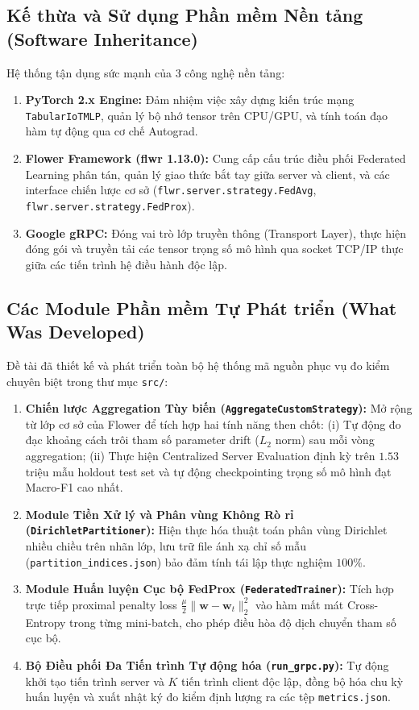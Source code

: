 \subsection{Kế thừa và Sử dụng Phần mềm Nền tảng (Software Inheritance)}
Hệ thống tận dụng sức mạnh của 3 công nghệ nền tảng:
\begin{enumerate}
    \item \textbf{PyTorch 2.x Engine:} Đảm nhiệm việc xây dựng kiến trúc mạng \texttt{TabularIoTMLP}, quản lý bộ nhớ tensor trên CPU/GPU, và tính toán đạo hàm tự động qua cơ chế Autograd.
    \item \textbf{Flower Framework (flwr 1.13.0):} Cung cấp cấu trúc điều phối Federated Learning phân tán, quản lý giao thức bắt tay giữa server và client, và các interface chiến lược cơ sở (\texttt{flwr.server.strategy.FedAvg}, \texttt{flwr.server.strategy.FedProx}).
    \item \textbf{Google gRPC:} Đóng vai trò lớp truyền thông (Transport Layer), thực hiện đóng gói và truyền tải các tensor trọng số mô hình qua socket TCP/IP thực giữa các tiến trình hệ điều hành độc lập.
\end{enumerate}

\subsection{Các Module Phần mềm Tự Phát triển (What Was Developed)}
Đề tài đã thiết kế và phát triển toàn bộ hệ thống mã nguồn phục vụ đo kiểm chuyên biệt trong thư mục \texttt{src/}:
\begin{enumerate}
    \item \textbf{Chiến lược Aggregation Tùy biến (\texttt{AggregateCustomStrategy}):} Mở rộng từ lớp cơ sở của Flower để tích hợp hai tính năng then chốt: (i) Tự động đo đạc khoảng cách trôi tham số parameter drift ($L_2$ norm) sau mỗi vòng aggregation; (ii) Thực hiện Centralized Server Evaluation định kỳ trên $1.53$ triệu mẫu holdout test set và tự động checkpointing trọng số mô hình đạt Macro-F1 cao nhất.
    \item \textbf{Module Tiền Xử lý và Phân vùng Không Rò rỉ (\texttt{DirichletPartitioner}):} Hiện thực hóa thuật toán phân vùng Dirichlet nhiều chiều trên nhãn lớp, lưu trữ file ánh xạ chỉ số mẫu (\texttt{partition\_indices.json}) bảo đảm tính tái lập thực nghiệm $100\%$.
    \item \textbf{Module Huấn luyện Cục bộ FedProx (\texttt{FederatedTrainer}):} Tích hợp trực tiếp proximal penalty loss $\frac{\mu}{2}\|\mathbf{w} - \mathbf{w}_t\|_2^2$ vào hàm mất mát Cross-Entropy trong từng mini-batch, cho phép điều hòa độ dịch chuyển tham số cục bộ.
    \item \textbf{Bộ Điều phối Đa Tiến trình Tự động hóa (\texttt{run\_grpc.py}):} Tự động khởi tạo tiến trình server và $K$ tiến trình client độc lập, đồng bộ hóa chu kỳ huấn luyện và xuất nhật ký đo kiểm định lượng ra các tệp \texttt{metrics.json}.
\end{enumerate}
